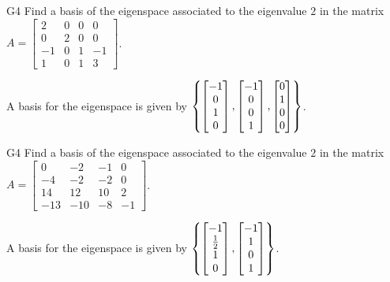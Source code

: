\begin{problem}{G4}
Find a basis of the eigenspace associated to the eigenvalue $2$ in the matrix $A=\begin{bmatrix} 2 & 0 & 0 & 0 \\ 0 & 2 & 0 & 0 \\ -1 & 0 & 1 & -1 \\ 1 & 0 & 1 & 3 \end{bmatrix}$.
\end{problem}
\begin{solution}
A basis for the eigenspace is given by $\left\{\begin{bmatrix} -1 \\ 0 \\ 1 \\ 0 \end{bmatrix}, \begin{bmatrix} -1 \\ 0 \\ 0 \\ 1 \end{bmatrix},\begin{bmatrix} 0 \\ 1 \\ 0 \\ 0 \end{bmatrix}\right\}$.
\end{solution}

\begin{problem}{G4}
Find a basis of the eigenspace associated to the eigenvalue $2$ in the matrix $A=\begin{bmatrix}0 & -2 & -1 & 0 \\ -4 & -2 & -2 & 0 \\ 14 & 12 & 10 & 2 \\ -13 & -10 & -8 & -1 \end{bmatrix}$.
\end{problem}
\begin{solution}
A basis for the eigenspace is given by $\left\{\begin{bmatrix} -1 \\ \frac{1}{2} \\ 1 \\ 0 \end{bmatrix},\begin{bmatrix} -1 \\ 1 \\ 0 \\ 1 \end{bmatrix}\right\}$.
\end{solution}

